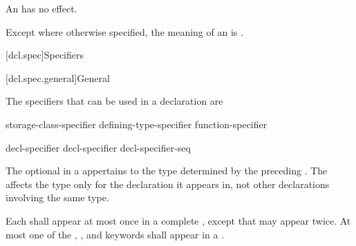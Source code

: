 \pnum
An  has no effect.

\pnum
Except where otherwise specified, the meaning of an 
is .

[dcl.spec]{Specifiers}%

[dcl.spec.general]{General}%

\pnum
{}%
The specifiers that can be used in a declaration are
\begin{bnf}
\br
    storage-class-specifier\br
    defining-type-specifier\br
    function-specifier\br
    \br
    \br
    \br
    \br
    \br
\end{bnf}

\begin{bnf}
\br
    decl-specifier \br
    decl-specifier decl-specifier-seq
\end{bnf}

The optional  in a 
appertains to the type determined by the preceding
. The 
affects the type only for the declaration it appears in, not other declarations involving the
same type.

\pnum
Each 
shall appear at most once in a complete ,
except that  may appear twice.
At most one of
the , , and  keywords
shall appear in a .

